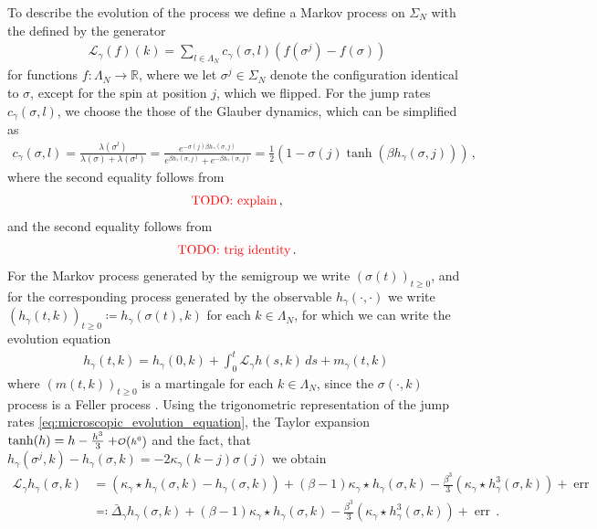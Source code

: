 \documentclass{report}
\newcommand{\RR}{\mathbb{R}}
\newcommand{\Convolve}[3][]{#2 \star_{#1} #3}
\DeclareMathOperator{\DefiningEquality}{\coloneqq}
\DeclareMathOperator{\DefiningEqualityRev}{\eqqcolon}
\theoremstyle{remark}
\theoremstyle{definition}
\newcommand{\TODO}[1]{\text{\textcolor{red}{TODO: #1}}\xspace}
\newcommand\smallO[1]{
    \mathchoice
    {%
      \scriptstyle\mathcal{O}\left(#1\right)
    }
    {%
      \scriptstyle\mathcal{O}\left(#1\right)
    }
    {%
      \scriptscriptstyle\mathcal{O}\left(#1\right)
    }
    {%
      \scalebox{0.8}{$\scriptscriptstyle\mathcal{O}$}\left(#1\right)
    }
}
\begin{document}
To describe the evolution of the process we define a Markov process on $\Sigma_N$ with the defined by the generator \begin{align}
  \mathcal{L}_\gamma(f)(k) = \sum_{l \in \Lambda_N} c_\gamma(\sigma, l)(f(\sigma^j) - f(\sigma))
\end{align}
for functions $f: \Lambda_N \to \RR$, where we let $\sigma^j \in \Sigma_N$ denote the configuration identical to $\sigma$, except for the spin at position $j$, which we flipped. For the jump rates $c_\gamma(\sigma, l)$, we choose the those of the Glauber dynamics, which can be simplified as
\begin{align}
  \label{eq:trig_jump_rates}
  c_\gamma(\sigma, l) = \frac{\lambda(\sigma^l)}{\lambda(\sigma) + \lambda(\sigma^l)} = \frac{e^{-\sigma(j)\beta h_\gamma(\sigma, j)}}{e^{\beta h_\gamma(\sigma, j)} + e^{-\beta h_\gamma(\sigma, j)}} = \frac{1}{2}\left(1 - \sigma(j) \tanh\left(\beta h_\gamma(\sigma, j)\right)\right)\,,
\end{align}
where the second equality follows from \begin{align}
  \TODO{explain}\,,
\end{align}
and the second equality follows from
\begin{align}
  \TODO{trig identity}\,.
\end{align}
For the Markov process generated by the semigroup we write $(\sigma(t))_{t \ge 0}$, and for the corresponding process generated by the observable $h_\gamma(\cdot, \cdot)$ we write $(h_\gamma(t, k))_{t \ge 0} \DefiningEquality h_\gamma(\sigma(t), k)$ for each $k \in \Lambda_N$, for which we can write the evolution equation
\begin{align}
  \label{eq:microscopic_evolution_equation}
  h_\gamma(t, k) = h_\gamma(0, k) + \int_{0}^{t} \mathcal{L}_\gamma h(s, k) \,ds + m_\gamma(t, k)\,
\end{align}
where $(m(t, k))_{t\ge 0}$ is a martingale for each $k\in \Lambda_N$\cite[Appendix B]{mourrat2015convergencetwodimensionaldynamicisingkac}, since the $\sigma(\cdot, k)$ process is a Feller process \cite[Section 6.5.1]{gall2016brownian}. Using the trigonometric representation of the jump rates \eqref{eq:microscopic_evolution_equation}, the Taylor expansion $\tanh(h) = h - \frac{h^3}{3} + \smallO{h^6}$ and the fact, that $h_\gamma(\sigma^j, k) - h_\gamma(\sigma, k) = -2 \kappa_\gamma(k-j) \sigma(j)$ we obtain 
\begin{align}
  \mathcal{L}_\gamma h_\gamma(\sigma, k) &= \left(\Convolve{\kappa_\gamma}{h_\gamma(\sigma, k)} - h_\gamma(\sigma, k)\right) + (\beta - 1) \Convolve{\kappa_\gamma}{h_\gamma(\sigma, k)} - \frac{\beta^3}{3}\left(\Convolve{\kappa_\gamma}{h_\gamma^3(\sigma, k)}\right) + \operatorname{err}\\
  &\DefiningEqualityRev \bar{\Delta}_\gamma h_\gamma(\sigma, k) + (\beta - 1) \Convolve{\kappa_\gamma}{h_\gamma(\sigma, k)} - \frac{\beta^3}{3}\left(\Convolve{\kappa_\gamma}{h_\gamma^3(\sigma, k)}\right) + \operatorname{err}\,.
\end{align}
\end{document}
